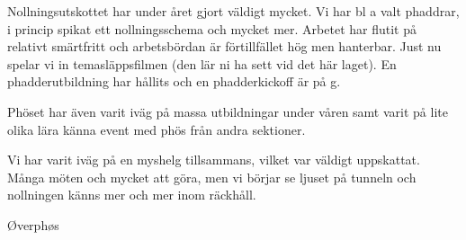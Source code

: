 \documentclass[../_main/handlingar.tex]{subfiles}
\begin{document}
Nollningsutskottet har under året gjort väldigt mycket. Vi har bl a valt phaddrar, i princip spikat ett nollningsschema och mycket mer. Arbetet har flutit på relativt smärtfritt och arbetsbördan är förtillfället hög men hanterbar. Just nu spelar vi in temasläppsfilmen (den lär ni ha sett vid det här laget). En phadderutbildning har hållits och en phadderkickoff är på g.

Phöset har även varit iväg på massa utbildningar under våren samt varit på lite olika lära känna event med phös från andra sektioner.

Vi har varit iväg på en myshelg tillsammans, vilket var väldigt uppskattat. Många möten och mycket att göra, men vi börjar se ljuset på tunneln och nollningen känns mer och mer inom räckhåll.

\begin{signatures}{1}
    \mvh
    \signature{Niklas Gustafson}{Øverphøs}
\end{signatures}
\end{document}
